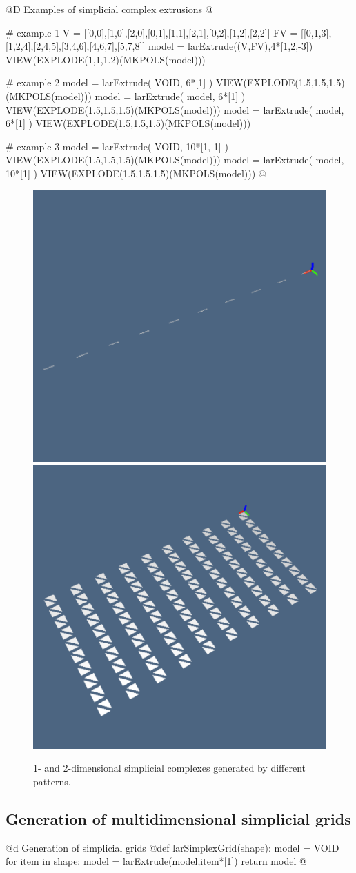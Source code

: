 \documentclass[11pt,oneside]{article}	%
\begin{document}
@D Examples of simplicial complex extrusions
@{# example 1
V = [[0,0],[1,0],[2,0],[0,1],[1,1],[2,1],[0,2],[1,2],[2,2]]
FV = [[0,1,3],[1,2,4],[2,4,5],[3,4,6],[4,6,7],[5,7,8]]
model = larExtrude((V,FV),4*[1,2,-3])
VIEW(EXPLODE(1,1,1.2)(MKPOLS(model)))

# example 2
model = larExtrude( VOID, 6*[1] )
VIEW(EXPLODE(1.5,1.5,1.5)(MKPOLS(model)))
model = larExtrude( model, 6*[1] )
VIEW(EXPLODE(1.5,1.5,1.5)(MKPOLS(model)))
model = larExtrude( model, 6*[1] )
VIEW(EXPLODE(1.5,1.5,1.5)(MKPOLS(model)))

# example 3
model = larExtrude( VOID, 10*[1,-1] )
VIEW(EXPLODE(1.5,1.5,1.5)(MKPOLS(model)))
model = larExtrude( model, 10*[1] )
VIEW(EXPLODE(1.5,1.5,1.5)(MKPOLS(model)))
@}


\begin{figure}[htbp] %
   \centering
   \includegraphics[height=0.25\linewidth,width=0.25\linewidth]{images/simplexn-2a} 
   \includegraphics[height=0.25\linewidth,width=0.25\linewidth]{images/simplexn-2b} 
   \caption{1- and 2-dimensional simplicial complexes generated by different patterns.}
   \label{fig:example}
\end{figure}


\subsection{Generation of multidimensional simplicial grids}

@d Generation of simplicial grids
@{def larSimplexGrid(shape):
    model = VOID
    for item in shape:
        model = larExtrude(model,item*[1])
    return model
@}
\end{document}
